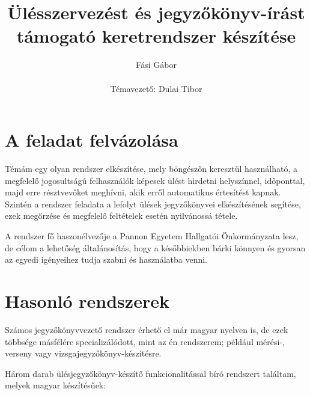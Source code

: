 \documentclass[a4paper,12pt,oneside]{report}
\title{\textbf{Ülésszervezést és jegyzőkönyv-írást támogató keretrendszer készítése}}
\author{Fási Gábor\\\\Témavezető: Dulai Tibor}
\date{}
\begin{document}
\setcounter{chapter}{1}

\maketitle

\listoftodos

\tableofcontents
\thispagestyle{empty}
\pagebreak

\setcounter{page}{1} %
\section{A feladat felvázolása}

Témám egy olyan rendszer elkészítése, mely böngészőn keresztül használható, a megfelelő jogosultságú felhasználók képesek ülést hirdetni helyszínnel, időponttal, majd erre résztvevőket meghívni, akik erről automatikus értesítést kapnak. Szintén a rendszer feladata a lefolyt ülések jegyzőkönyvei elkészítésének segítése, ezek megőrzése és megfelelő feltételek esetén nyilvánossá tétele.

A rendszer fő haszonélvezője a Pannon Egyetem Hallgatói Önkormányzata lesz, de célom a lehetőség általánosítás, hogy a későbbiekben bárki könnyen és gyorsan az egyedi igényeihez tudja szabni és használatba venni.

\section{Hasonló rendszerek}

Számos jegyzőkönyvvezető rendszer érhető el már magyar nyelven is, de ezek többsége másfélére specializálódott, mint az én rendszerem; például mérési-, verseny vagy vizsgajegyzőkönyv-készítésre.

Három darab ülésjegyzőkönyv-készítő funkcionalitással bíró rendszert találtam, melyek magyar készítésűek:
\end{document}
